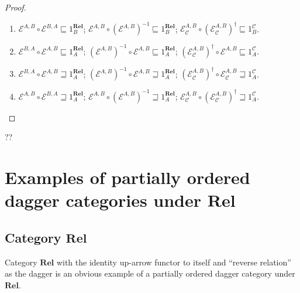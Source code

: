 \begin{proof}
  ~
  \begin{enumerate}
    \item $\mathcal{E}^{A,B} \circ \mathcal{E}^{B,A} \sqsubseteq
    1^{\mathbf{Rel}}_B$; $\mathcal{E}^{A,B} \circ (\mathcal{E}^{A,B})^{- 1} \sqsubseteq 1^{\mathbf{Rel}}_B$;
    $\mathcal{E}_{\mathcal{C}}^{A,B} \circ (\mathcal{E}_{\mathcal{C}}^{A,B})^{\dagger} \sqsubseteq 1^{\mathcal{C}}_B$.
    
    \item $\mathcal{E}^{B,A} \circ \mathcal{E}^{A,B} \sqsubseteq
    1^{\mathbf{Rel}}_A$; $(\mathcal{E}^{A,B})^{- 1} \circ \mathcal{E}^{A,B} \sqsubseteq 1^{\mathbf{Rel}}_A$;
    $(\mathcal{E}_{\mathcal{C}}^{A,B})^{\dagger} \circ \mathcal{E}^{A,B} \sqsubseteq 1^{\mathcal{C}}_A$.
    
    \item $\mathcal{E}^{B,A} \circ \mathcal{E}^{A,B} \sqsupseteq
    1^{\mathbf{Rel}}_A$; $(\mathcal{E}^{A,B})^{- 1} \circ \mathcal{E}^{A,B} \sqsupseteq 1^{\mathbf{Rel}}_A$;
    $(\mathcal{E}_{\mathcal{C}}^{A,B})^{\dagger} \circ \mathcal{E}_{\mathcal{C}}^{A,B} \sqsupseteq 1^{\mathcal{C}}_A$.
    
    \item $\mathcal{E}^{A,B} \circ \mathcal{E}^{B,A} \sqsupseteq
    1^{\mathbf{Rel}}_A$; $\mathcal{E}^{A,B} \circ (\mathcal{E}^{A,B})^{- 1} \sqsupseteq 1^{\mathbf{Rel}}_A$;
    $\mathcal{E}_{\mathcal{C}}^{A,B} \circ (\mathcal{E}_{\mathcal{C}}^{A,B})^{\dagger} \sqsupseteq 1^{\mathcal{C}}_A$.
  \end{enumerate}
\end{proof}

??

\section{\texorpdfstring{Examples of partially ordered dagger categories under
$\mathbf{Rel}$}{Examples of partially ordered dagger categories under Rel}}

\subsection{\texorpdfstring{Category $\mathbf{Rel}$}{Category Rel}}

Category $\mathbf{Rel}$ with the identity up-arrow functor to itself
and ``reverse relation'' as the dagger is an obvious example of a partially
ordered dagger category under $\mathbf{Rel}$.

